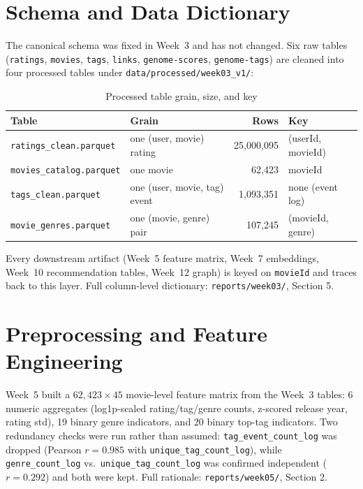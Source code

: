 \documentclass[12pt,a4paper]{article}
\begin{document}
\section{Schema and Data Dictionary}

The canonical schema was fixed in Week~3 and has not changed. Six raw tables (\texttt{ratings},
\texttt{movies}, \texttt{tags}, \texttt{links}, \texttt{genome-scores}, \texttt{genome-tags}) are
cleaned into four processed tables under \texttt{data/processed/week03\_v1/}:

\begin{table}[H]
\centering
\caption{Processed table grain, size, and key}
\begin{tabular}{lp{3.6cm}rl}
\toprule
\textbf{Table} & \textbf{Grain} & \textbf{Rows} & \textbf{Key} \\
\midrule
\texttt{ratings\_clean.parquet} & one (user, movie) rating & 25,000,095 & (userId, movieId) \\
\texttt{movies\_catalog.parquet} & one movie & 62,423 & movieId \\
\texttt{tags\_clean.parquet} & one (user, movie, tag) event & 1,093,351 & none (event log) \\
\texttt{movie\_genres.parquet} & one (movie, genre) pair & 107,245 & (movieId, genre) \\
\bottomrule
\end{tabular}
\end{table}

Every downstream artifact (Week~5 feature matrix, Week~7 embeddings, Week~10 recommendation
tables, Week~12 graph) is keyed on \texttt{movieId} and traces back to this layer. Full
column-level dictionary: \texttt{reports/week03/}, Section 5.

\section{Preprocessing and Feature Engineering}

Week~5 built a $62{,}423 \times 45$ movie-level feature matrix from the Week~3 tables: 6 numeric
aggregates (log1p-scaled rating/tag/genre counts, z-scored release year, rating std), 19 binary
genre indicators, and 20 binary top-tag indicators. Two redundancy checks were run rather than
assumed: \texttt{tag\_event\_count\_log} was dropped (Pearson $r=0.985$ with
\texttt{unique\_tag\_count\_log}), while \texttt{genre\_count\_log} vs.\
\texttt{unique\_tag\_count\_log} was confirmed independent ($r=0.292$) and both were kept. Full
rationale: \texttt{reports/week05/}, Section 2.
\end{document}
